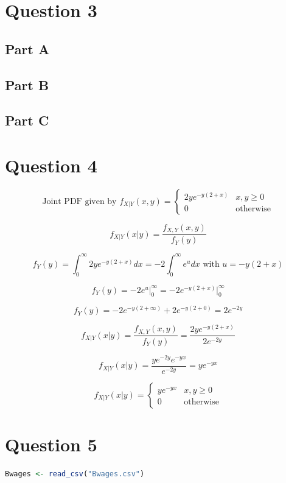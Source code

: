 \documentclass[letterpaper]{article}
\begin{document}
\section*{Question 3}

\subsection*{Part A}

\subsection*{Part B}

\subsection*{Part C}

\section*{Question 4}

$$\text{Joint PDF given by } f_{X|Y}(x, y) = \begin{cases} 2ye^{-y(2+x)} & x, y \geq 0 \\ 0  & \text{otherwise} \end{cases}$$

$$f_{X|Y}(x|y) = \frac{f_{X,Y}(x, y)}{f_Y(y)}$$

$$f_Y(y) = \int_0^{\infty} 2ye^{-y(2+x)} dx = -2 \int_0^{\infty} e^u dx \text{ with } u = -y(2+x)$$

$$f_Y(y) = -2 e^u \Big|_0^{\infty} = -2 e^{-y(2+x)} \Big|_0^{\infty}$$

$$f_Y(y) = -2 e^{-y(2+ \infty)} + 2 e^{-y(2+0)} = 2 e^{-2y}$$

$$f_{X|Y}(x|y) = \frac{f_{X,Y}(x, y)}{f_Y(y)} = \frac{2ye^{-y(2+x)}}{2 e^{-2y}}$$

$$f_{X|Y}(x|y) = \frac{y e^{-2y} e^{-yx}}{e^{-2y}} = y e^{-yx}$$

$$f_{X|Y}(x|y) = \begin{cases} y e^{-yx} & x, y \geq 0 \\ 0 & \text{otherwise} \end{cases}$$

\section*{Question 5}

\begin{lstlisting}[language=R]
    Bwages <- read_csv("Bwages.csv")
\end{lstlisting}
\end{document}
